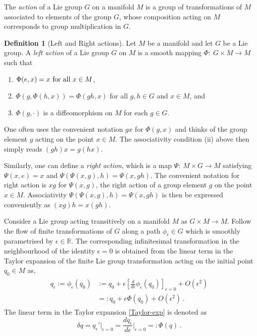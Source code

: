 \documentclass[11pt, oneside]{article}   	%
\numberwithin{equation}{section}
\theoremstyle{plain}
\theoremstyle{definition}
\newtheorem{definition}[theorem]{Definition}
\theoremstyle{remark}
\newcommand{\<}{\langle}
\renewcommand{\>}{\rangle}
\begin{document}
The \emph{action} of a Lie group $G$ on a
manifold $M$ is a group of transformations of $M$ associated to 
elements of the group $G$, whose composition acting on $M$ corresponds
to group multiplication in $G$.

\begin{definition}[Left and Right actions] Let $M$ be a manifold and let $G$ be a Lie group. A
\emph{left action} of a Lie group  $G$ on $M$ is a smooth mapping 
$\Phi{:\ }  G\times M\to M$ such that 
\begin{enumerate}
\item[(i)] $\Phi(e, x) = x \hbox{ for all } x \in M$, 
\item[(ii)] $\Phi(g, \Phi(h, x)) = \Phi(gh, x)$ for all $g, h \in G$ and $x \in
M$, and 
\item[(iii)] $\Phi(g, \cdot)$ is a diffeomorphism on $M$ 
for each $g \in G$. 
\end{enumerate}
One often uses the convenient notation $gx$ for $\Phi(g, x)$ and
thinks of the group element $g$ acting on the point $x \in M$. The
associativity condition (ii) above then simply reads $(gh)x = g(hx)$.
\end{definition}
Similarly, one can define a \emph{right action}, 
which is a map $\Psi{:\ } 
M\times G\to M$  satisfying $\Psi(x,e) = x$ and $\Psi(\Psi(x,g),h) =
\Psi(x,gh)$. The convenient notation for right action is $xg$ for
$\Psi(x, g)$, the right action of a group element $g$ on the point
$x\in M$. Associativity $\Psi(\Psi(x,g),h) = \Psi(x,gh)$ is
then be expressed conveniently as $(xg)h=x(gh)$.

\newpage

Consider a Lie group acting transitively on a manifold $M$ as $G\times M\to M$. 
Follow the flow of finite transformations of $G$ along a path $\phi_\epsilon\in G$ which is smoothly parametrised by $\epsilon\in \mathbb{R}$. 
The corresponding infinitesimal  transformation in the neighbourhood
of the identity $\epsilon=0$ is obtained from the linear term in the Taylor expansion of the finite Lie group transformation acting on the initial point $q_0\in M$ as,
\begin{align}
\begin{split}
q_\epsilon := \phi_\epsilon (q_0) &:= 
q_0 + \epsilon \left[\frac{d}{d\epsilon}\phi_\epsilon (q_0)\right]_{\epsilon=0}
+ O(\epsilon^2)
\\&=:
q_0 + \epsilon \Phi(q_0)
+ O(\epsilon^2)
\,.
\end{split}
\label{Taylor-exp}
\end{align}
The linear term in the Taylor expansion \eqref{Taylor-exp} is denoted as 
\[\delta q  = q_\epsilon' |_{\epsilon=0} = \frac{dq_\epsilon}{d\epsilon} \Big|_{\epsilon=0} =: \Phi(q)\,.\]
%
\end{document}
